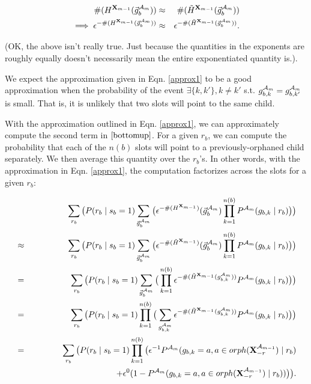 \documentclass[11pt]{article}
\newcommand{\A}{{\cal A}}
\newcommand{\X}{\mathbf{X}}
\newcommand{\XrmPrev}{\X^{\A_{m-1}}_{-r}}
\newcommand{\Am}{\A_{m}}
\begin{document}
\begin{eqnarray}
\#(H^{\X_{m-1}}(\vec{g}^{\Am}_b)) &\approx& \#(\tilde{H}^{\X_{m-1}} (\vec{g}^{\Am}_b)) \\
\implies \epsilon^{-\#(H^{\X_{m-1}}(\vec{g}^{\Am}_b))} &\approx& \epsilon^{-\#(\tilde{H}^{\X_{m-1}}(\vec{g}^{\Am}_b))} \label{approx1}.
\end{eqnarray}

(OK, the above isn't really true. Just because the quantities in the exponents are roughly equally doesn't necessarily mean the entire exponentiated quantity is.).
 
We expect the approximation given in Eqn. \ref{approx1} to be a good approximation when the probability of the event $\exists \{k,k'\}, k \neq k'$ s.t. $g^{\Am}_{b,k}=g^{\Am}_{b,k'}$ is small. That is, it is unlikely that two slots will point to the same child.

With the approximation outlined in Eqn. \ref{approx1}, we can approximately compute the second term in $\ref{bottomup}$. For a given $r_b$, we can compute the probability that each of the $n(b)$ slots will point to a previously-orphaned child separately. We then average this quantity over the $r_b$'s. In other words, with the approximation in Eqn. \ref{approx1}, the computation factorizes across the slots for a given $r_b$:

\begin{eqnarray}
& & \sum_{r_b} \big(P(r_b \mid s_b = 1) \sum_{\vec{g}^{\Am}_{b}} \big( \epsilon^{-\#(H^{\X_{m-1}})}(\vec{g}^{\Am}_b) \prod_{k=1}^{n(b)} P^{\Am}(g_{b,k} \mid r_b) \big) \big) \\
%
&\approx& \sum_{r_b} \big(P(r_b \mid s_b = 1) \sum_{\vec{g}^{\Am}_{b}} \big( \epsilon^{-\#(\tilde{H}^{\X_{m-1}})}(\vec{g}^{\Am}_b) \prod_{k=1}^{n(b)} P^{\Am}(g_{b,k} \mid r_b) \big) \big) \label{eqn.bottomupTilde}  \\
%
&=& \sum_{r_b} \big( P(r_b \mid s_b = 1) \sum_{\vec{g}^{\Am}_{b}} \big( \prod_{k=1}^{n(b)} \epsilon^{-\#(\tilde{H}^{\X_{m-1}}(g^{\Am}_{b,k}))}P^{\Am}(g_{b,k} \mid r_b) \big) \big) \\
%
&=& \sum_{r_b} \big( P(r_b \mid s_b = 1) \prod_{k=1}^{n(b)} \big( \sum_{g^{\Am}_{b,k}} \epsilon^{-\#(\tilde{H}^{\X_{m-1}}(g^{\Am}_{b,k}))}P^{\Am}(g_{b,k} \mid r_b) \big) \big) \\
%
&=& \sum_{r_b} \big( P(r_b \mid s_b = 1) \prod_{k=1}^{n(b)} \big ( \epsilon^{-1}P^{\Am}(g_{b,k} = a, a \in orph(\XrmPrev) \mid r_b) \\ 
& & \qquad \qquad \qquad \qquad \qquad + \epsilon^{0}(1-P^{\Am}(g_{b,k} = a, a \in orph(\XrmPrev) \mid r_b)) \big) \big). \nonumber \label{eqn.approxBottomUpFinal}
\end{eqnarray}
\end{document}
